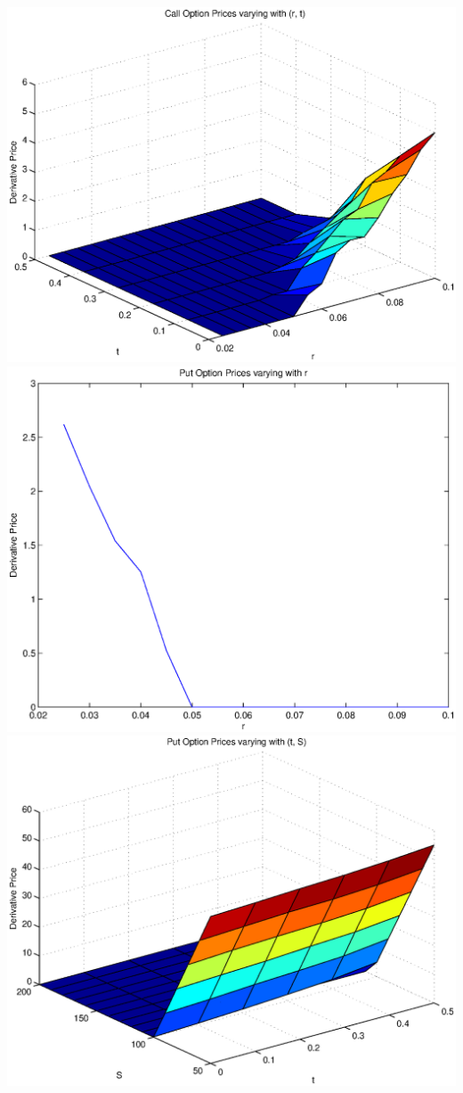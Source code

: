 \documentclass{article}
\begin{document}
\includegraphics[width=\textwidth]{Call_Option_Prices_varying_with_(r,_t)}
\includegraphics[width=\textwidth]{Put_Option_Prices_varying_with_r}
\includegraphics[width=\textwidth]{Put_Option_Prices_varying_with_(t,_S)}
\end{document}
